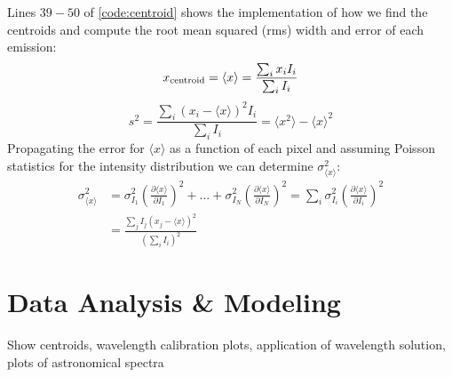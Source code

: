 \documentclass[preprint]{aastex62}
\begin{document}
Lines $39-50$ of \ref{code:centroid} shows the implementation of how we find the centroids and compute the root mean squared (rms) width and error of each emission:
\begin{equation}
    x_{\rm centroid} = \langle x \rangle = \frac{\sum_i x_i I_i}{\sum_i I_i} 
\end{equation}
\begin{equation}
    s^2 = \frac{\sum_i (x_i - \langle x \rangle)^2 I_i}{\sum_i I_i} = \langle x^2 \rangle - \langle x \rangle^2
\end{equation}
Propagating the error for $\langle x \rangle$ as a function of each pixel and assuming Poisson statistics for the intensity distribution we can determine $\sigma_{\langle x \rangle}^2$:
\begin{align}
    \sigma_{\langle x \rangle}^2 
    &= \sigma_{I_1}^2 \left(\frac{\partial \langle x \rangle}{\partial I_1} \right)^2
    + ... + \sigma_{I_N}^2 \left(\frac{\partial \langle x \rangle}{\partial I_N} \right)^2
    = \sum_i \sigma_{I_i}^2 \left(\frac{\partial \langle x \rangle}{\partial I_i} \right)^2 \\
    &= \frac{\sum_j I_j (x_j - \langle x \rangle)^2}{\left(\sum_i I_i \right)^2}
\end{align}


\section{Data Analysis \& Modeling} \label{sec:analysis}
Show centroids, wavelength calibration plots, application of wavelength solution, plots of astronomical spectra
\end{document}
